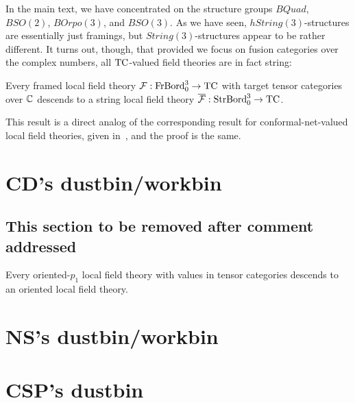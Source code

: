 \documentclass{amsart}
\begin{document}
In the main text, we have concentrated on the structure groups $BQuad$, $BSO(2)$, $BOrpo(3)$, and $BSO(3)$.  As we have seen, $hString(3)$-structures are essentially just framings, but $String(3)$-structures appear to be rather different.  It turns out, though, that provided we focus on fusion categories over the complex numbers, all $\mathrm{TC}$-valued field theories are in fact string:

\begin{proposition} \label{prop-string}
Every framed local field theory $\mathcal F : \mathrm{FrBord}_0^3 \rightarrow \mathrm{TC}$ with target tensor categories over $\mathbb C$ descends to a string local field theory $\overline{\mathcal F} : \mathrm{StrBord}_0^3 \rightarrow \mathrm{TC}$.
\end{proposition}

\nid This result is a direct analog of the corresponding result for conformal-net-valued local field theories, given in~\cite{bdh-lft}, and the proof is the same.


\section{CD's dustbin/workbin}

\subsection{This section to be removed after comment addressed} \label{sec-pivot-struc}

\begin{conjecture}
Every oriented-$p_1$ local field theory with values in tensor categories descends to an oriented local field theory.
\end{conjecture}


\section{NS's dustbin/workbin}


\section{CSP's dustbin}
\end{document}
